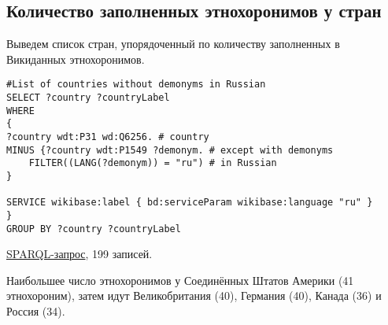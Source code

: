 \subsection{Количество заполненных этнохоронимов у стран}

Выведем список стран, упорядоченный по количеству заполненных в Викиданных этнохоронимов.

\begin{lstlisting}[language=SPARQL label=countcountry, caption=тран упорядоченных по колличеству заполненных этнохоронимов]
#List of countries without demonyms in Russian
SELECT ?country ?countryLabel 
WHERE
{
?country wdt:P31 wd:Q6256. # country
MINUS {?country wdt:P1549 ?demonym. # except with demonyms
    FILTER((LANG(?demonym)) = "ru") # in Russian
} 

SERVICE wikibase:label { bd:serviceParam wikibase:language "ru" }
}
GROUP BY ?country ?countryLabel
\end{lstlisting}

\href{https://query.wikidata.org/#%23Count%20of%20demonyms%20in%20countries%0ASELECT%20%20%3Fcountry%20%3FcountryLabel%20%28count%28%2a%29%20as%20%3Fcount%29%0AWHERE%0A%7B%0A%09%3Fcountry%20wdt%3AP31%20wd%3AQ6256.%20%20%20%20%20%20%23country%0A%09%3Fcountry%20wdt%3AP1549%20%3Fdemonym%20.%20%20%20%23demonym%0A%09SERVICE%20wikibase%3Alabel%20%7B%20bd%3AserviceParam%20wikibase%3Alanguage%20%22ru%22%20%7D%0A%7D%0A%0AGROUP%20BY%20%3Fcountry%20%3FcountryLabel%20%0AORDER%20BY%20DESC%28%3Fcount%29%0A}{SPARQL-запрос}, 199 записей. 

Наибольшее число этнохоронимов у Соединённых Штатов Америки (41 этнохороним), затем идут Великобритания (40), Германия (40), Канада (36) и Россия (34).
